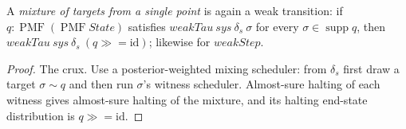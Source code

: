 \begin{lemma}
  \label{lem:bind}
  \leanok
  A \emph{mixture of targets from a single point} is again a weak transition: if $q : \operatorname{PMF}(\operatorname{PMF} State)$ satisfies $weakTau\ sys\ \delta_s\ \sigma$ for every $\sigma \in \operatorname{supp} q$, then $weakTau\ sys\ \delta_s\ (q \mathbin{\gg\!=} \mathrm{id})$; likewise for $weakStep$.
\end{lemma}

\begin{proof}\leanok
  The crux.
  Use a posterior-weighted mixing scheduler: from $\delta_s$ first draw a target $\sigma \sim q$ and then run $\sigma$'s witness scheduler.
  Almost-sure halting of each witness gives almost-sure halting of the mixture, and its halting end-state distribution is $q \mathbin{\gg\!=} \mathrm{id}$.
\end{proof}
